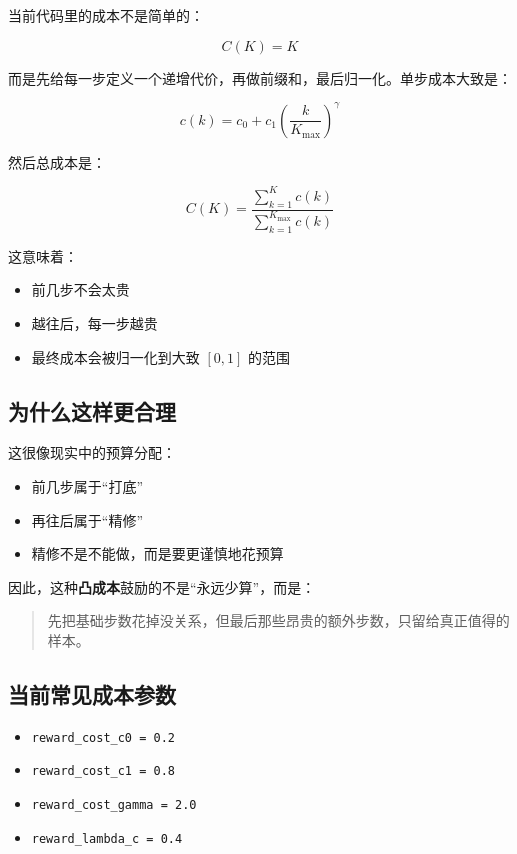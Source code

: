 \documentclass[12pt]{ctexart}
\begin{document}
当前代码里的成本不是简单的：

\begin{equation}
    C(K) = K
\end{equation}

而是先给每一步定义一个递增代价，再做前缀和，最后归一化。单步成本大致是：

\begin{equation}
    c(k) = c_0 + c_1 \left(\frac{k}{K_{\max}}\right)^{\gamma}
\end{equation}

然后总成本是：

\begin{equation}
    C(K) = \frac{\sum_{k=1}^{K} c(k)}{\sum_{k=1}^{K_{\max}} c(k)}
\end{equation}

这意味着：

\begin{itemize}
    \item 前几步不会太贵
    \item 越往后，每一步越贵
    \item 最终成本会被归一化到大致 $[0,1]$ 的范围
\end{itemize}

\subsection{为什么这样更合理}

这很像现实中的预算分配：

\begin{itemize}
    \item 前几步属于“打底”
    \item 再往后属于“精修”
    \item 精修不是不能做，而是要更谨慎地花预算
\end{itemize}

因此，这种\textbf{凸成本}鼓励的不是“永远少算”，而是：

\begin{quote}
    先把基础步数花掉没关系，但最后那些昂贵的额外步数，只留给真正值得的样本。
\end{quote}

\subsection{当前常见成本参数}

\begin{itemize}
    \item \texttt{reward\_cost\_c0 = 0.2}
    \item \texttt{reward\_cost\_c1 = 0.8}
    \item \texttt{reward\_cost\_gamma = 2.0}
    \item \texttt{reward\_lambda\_c = 0.4}
\end{itemize}
\end{document}
